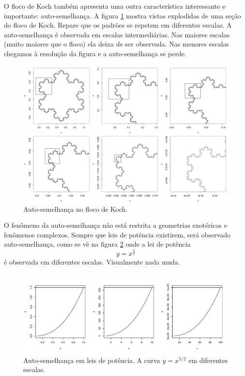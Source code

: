 O floco de Koch também apresenta uma outra característica interessante e importante: auto-semelhança. A figura \ref{fig:koch-self} mostra vistas explodidas de uma seção do floco de Koch. Repare que os padrões se repetem em diferentes escalas. A auto-semelhança é observada em escalas intermediárias. Nas maiores escalas (muito maiores que o floco) ela deixa de ser observada. Nas menores escalas chegamos à resolução da figura e a auto-semelhança se perde. 

\begin{figure}
\centering
\includegraphics[width=1\textwidth]{./figuras/koch-self.png}
\caption{Auto-semelhança no floco de Koch.}
\label{fig:koch-self}
\end{figure}


O fenômeno da auto-semelhança não está restrita a geometrias exotéricas e fenômenos complexos. Sempre que leis de potência existirem, será observado auto-semelhança, como se vê na figura \ref{fig:power-law} onde a lei de potência 
\[
y = x^\frac{5}{2}
\]
é observada em diferentes escalas. Visualmente nada muda.

\begin{figure}
\centering
\includegraphics[width=\textwidth]{./figuras/power.pdf}
\caption{Auto-semelhança em leis de potência. A curva $y = x^{5/2}$ em diferentes escalas.}
\label{fig:power-law}
\end{figure}

